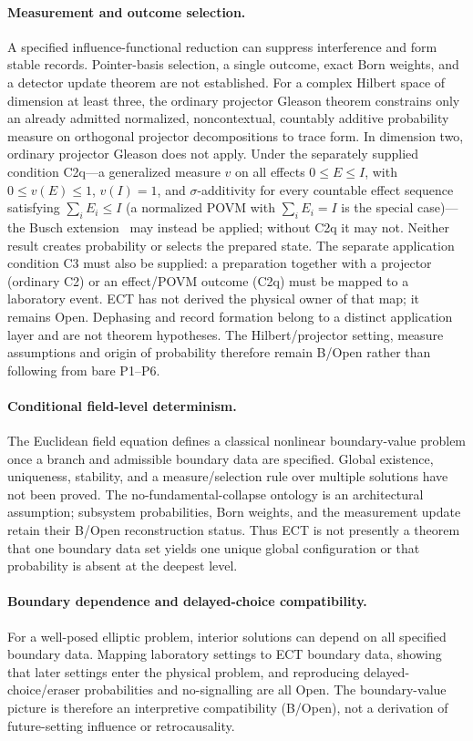 \documentclass[11pt,a4paper]{article}
\begin{document}
\paragraph{Measurement and outcome selection.}
A specified influence-functional reduction can suppress interference and form
  stable records.  Pointer-basis selection, a single outcome, exact Born weights,
  and a detector update theorem are not established.  For a complex Hilbert space of dimension at least three, the ordinary projector Gleason theorem constrains only an already admitted normalized, noncontextual, countably additive probability measure on orthogonal projector decompositions to trace form.  In dimension two, ordinary projector Gleason does not apply.  Under the separately supplied condition C2q---a generalized measure $v$ on all effects $0\le E\le I$, with $0\le v(E)\le1$, $v(I)=1$, and $\sigma$-additivity for every countable effect sequence satisfying $\sum_iE_i\le I$ (a normalized POVM with $\sum_iE_i=I$ is the special case)---the Busch extension~\cite{Busch2003Gleason} may instead be applied; without C2q it may not.  Neither result creates probability or selects the prepared state.  The separate application condition C3 must also be supplied: a preparation together with a projector (ordinary C2) or an effect/POVM outcome (C2q) must be mapped to a laboratory event.  ECT has not derived the physical owner of that map; it remains Open.  Dephasing and record formation belong to a distinct application layer and are not theorem hypotheses.  The Hilbert/projector setting, measure assumptions and origin
  of probability therefore remain B/Open rather than following from bare
  P1--P6.

\paragraph{Conditional field-level determinism.}
The Euclidean field equation defines a classical nonlinear boundary-value
problem once a branch and admissible boundary data are specified.  Global
existence, uniqueness, stability, and a measure/selection rule over multiple
solutions have not been proved.  The no-fundamental-collapse ontology is an
architectural assumption; subsystem probabilities, Born weights, and the
measurement update retain their B/Open reconstruction status.  Thus ECT is
not presently a theorem that one boundary data set yields one unique global
configuration or that probability is absent at the deepest level.

\paragraph{Boundary dependence and delayed-choice compatibility.}
For a well-posed elliptic problem, interior solutions can depend on all
specified boundary data.  Mapping laboratory settings to ECT boundary data,
showing that later settings enter the physical problem, and reproducing
delayed-choice/eraser probabilities and no-signalling are all Open.  The
boundary-value picture is therefore an interpretive compatibility (B/Open),
not a derivation of future-setting influence or retrocausality.
\end{document}
